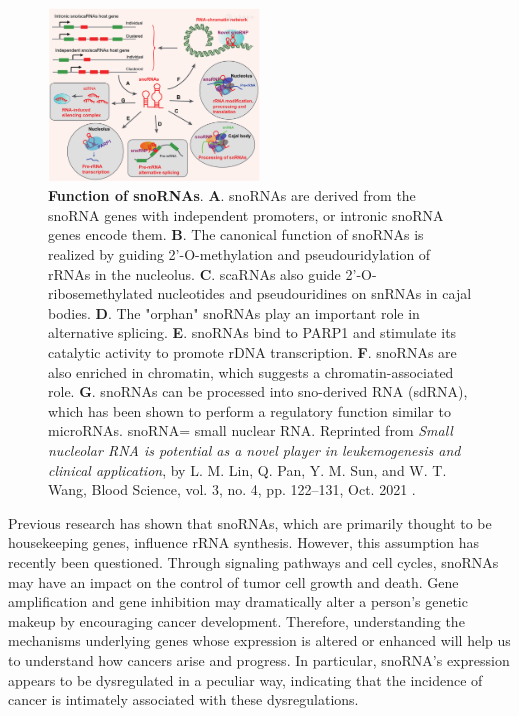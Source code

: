 \documentclass[journal]{IEEEtran}
\begin{document}
\begin{figure}[h]
    \centering
    \includegraphics[width=0.5\textwidth]{images/Functions_snoRNAs.png}
    \caption{\textbf{Function of snoRNAs}. \textbf{A}. snoRNAs are derived from the snoRNA genes with independent promoters, or intronic snoRNA genes encode them. \textbf{B}. The canonical function of snoRNAs is realized by guiding 2'-O-methylation and pseudouridylation of rRNAs in the nucleolus. \textbf{C}. scaRNAs also guide 2'-O-ribosemethylated nucleotides and pseudouridines on snRNAs in cajal bodies. \textbf{D}. The "orphan" snoRNAs play an important role in alternative splicing. \textbf{E}. snoRNAs bind to PARP1 and stimulate its catalytic activity to promote rDNA transcription. \textbf{F}. snoRNAs are also enriched in chromatin, which suggests a chromatin-associated role. \textbf{G}. snoRNAs can be processed into sno-derived RNA (sdRNA), which has been shown to perform a regulatory function similar to microRNAs. snoRNA= small nuclear RNA. \newline
    Reprinted from \textit{Small nucleolar RNA is potential as a novel player in leukemogenesis and clinical application}, by L. M. Lin, Q. Pan, Y. M. Sun, and W. T. Wang, Blood Science, vol. 3, no. 4, pp. 122–131, Oct. 2021 \cite{Lin2021}.}
    \label{fig:functions_snoRNAs}
\end{figure}

Previous research has shown that snoRNAs, which are primarily thought to be housekeeping genes, influence rRNA synthesis. However, this assumption has recently been questioned. Through signaling pathways and cell cycles, snoRNAs may have an impact on the control of tumor cell growth and death. 
Gene amplification and gene inhibition may dramatically alter a person's genetic makeup by encouraging cancer development. Therefore, understanding the mechanisms underlying genes whose expression is altered or enhanced will help us to understand how cancers arise and progress. In particular, snoRNA's expression appears to be dysregulated in a peculiar way, indicating that the incidence of cancer is intimately associated with these dysregulations. \cite{Zhang2019} \newline
\end{document}
